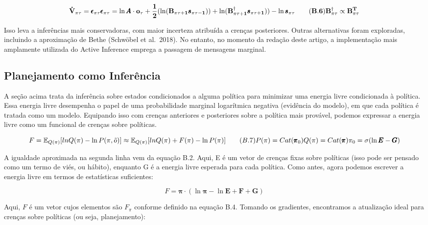 \documentclass[
  12pt,
]{book}
\begin{document}
\[ \bf \dot V_{\pi\tau} = \pmb\epsilon_{\pi\tau} \\ 
\pmb \epsilon_{\pi\tau} = \ln \pmb A \cdot o_\tau + \frac{1}{2}(\ln (B_{\pi\tau+1}\pmb s_{\pi\tau-1} )) + \ln (B^\dagger_{\pi\tau+1}\pmb s_{\pi\tau+1} )) - \ln \pmb s_{\pi\tau} \qquad (B.6)\\ 
B^\dagger_{\pi\tau} \propto B^T_{\pi\tau} 
\]

Isso leva a inferências mais conservadoras, com maior incerteza atribuída a crenças posteriores. Outras alternativas foram exploradas, incluindo a aproximação de Bethe (Schwöbel et al.~2018). No entanto, no momento da redação deste artigo, a implementação mais amplamente utilizada do Active Inference emprega a passagem de mensagens marginal.

\hypertarget{planejamento-como-inferuxeancia-1}{%
\subsection{Planejamento como Inferência}\label{planejamento-como-inferuxeancia-1}}

A seção acima trata da inferência sobre estados condicionados a alguma política para minimizar uma energia livre condicionada à política. Essa energia livre desempenha o papel de uma probabilidade marginal logarítmica negativa (evidência do modelo), em que cada política é tratada como um modelo. Equipando isso com crenças anteriores e posteriores sobre a política mais provável, podemos expressar a energia livre como um funcional de crenças sobre políticas.

\[F = \mathbb E_{Q(\pi)}[lnQ(\pi)-\ln P(\pi,\tilde o)] \\ 
\approx \mathbb E_{Q(\pi)}[lnQ(\pi) +F(\pi) -\ln P(\pi)]  \qquad (B.7)\\
P(\pi) = Cat(\pmb \pi_0) \\
Q(\pi) = Cat(\pmb \pi) \\
\pi_0 = \sigma(\ln \pmb E - \pmb G)
\]

A igualdade aproximada na segunda linha vem da equação B.2. Aqui, E é um vetor de crenças fixas sobre políticas (isso pode ser pensado como um termo de viés, ou hábito), enquanto G é a energia livre esperada para cada política. Como antes, agora podemos escrever a energia livre em termos de estatísticas suficientes:

\[F = \pmb \pi \cdot (\ln \pmb\pi - \ln \pmb E + \pmb F + \pmb G )\]

Aqui, \(F\) é um vetor cujos elementos são \(F_π\) conforme definido na equação B.4. Tomando os gradientes, encontramos a atualização ideal para crenças sobre políticas (ou seja, planejamento):
\end{document}
